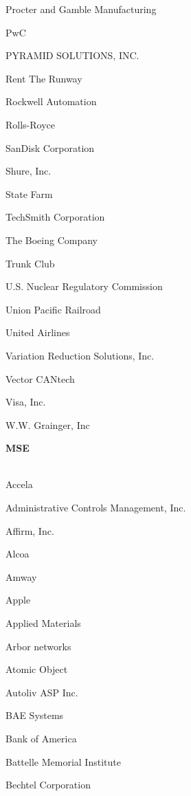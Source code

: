 \documentclass[twoside]{article}
\begin{document}
\begin{center}
\begin{multicols}{5}
\begin{FlushLeft}
\begin{compactitem}
\item Procter and Gamble Manufacturing
\item PwC
\item PYRAMID SOLUTIONS, INC.
\item Rent The Runway
\item Rockwell Automation
\item Rolls-Royce
\item SanDisk Corporation
\item Shure, Inc.
\item State Farm
\item TechSmith Corporation
\item The Boeing Company
\item Trunk Club
\item U.S. Nuclear Regulatory Commission
\item Union Pacific Railroad
\item United Airlines
\item Variation Reduction Solutions, Inc.
\item Vector CANtech
\item Visa, Inc.
\item W.W. Grainger, Inc
\end{compactitem}
        \end{FlushLeft}
        \vspace{1em}
        {\fontsize{14}{16}\selectfont \bf MSE}\\
        \vspace{-1em}
        ~\hrulefill~
        \vspace{-.9em}
        \begin{FlushLeft}
        \begin{compactitem}
        \item Accela
\item Administrative Controls Management, Inc.
\item Affirm, Inc.
\item Alcoa
\item Amway
\item Apple
\item Applied Materials
\item Arbor networks
\item Atomic Object
\item Autoliv ASP Inc.
\item BAE Systems
\item Bank of America
\item Battelle Memorial Institute
\item Bechtel Corporation

\end{compactitem}
\end{FlushLeft}
\end{multicols}
\end{center}
\end{document}
